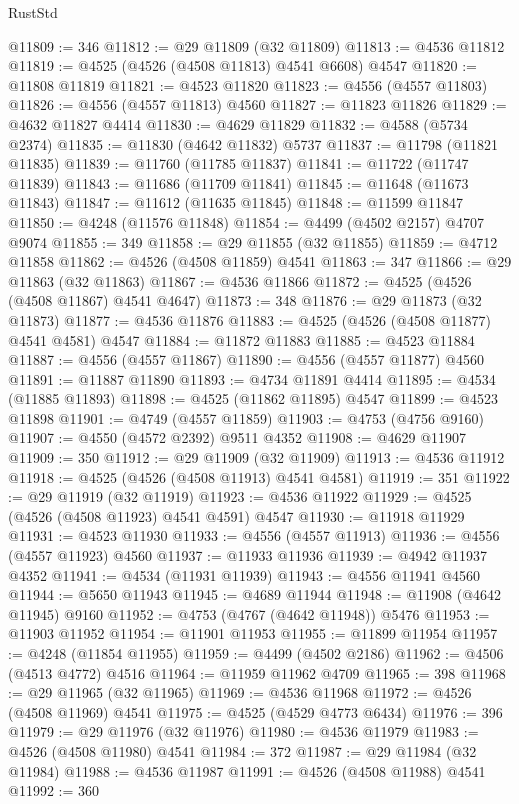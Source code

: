 \begin{lexlean}{RustStd}
\begin{coremodule}
{\begin{coremodule}
{{{{{{{{{{{{{{{{{{{{{{{{{{{{{{{{{{{{{{{{{{{{{{{{{{{{{{{@11809 := 346
@11812 := @29 @11809 (@32 @11809)
@11813 := @4536 @11812
@11819 := @4525 (@4526 (@4508 @11813) @4541 @6608) @4547
@11820 := @11808 @11819
@11821 := @4523 @11820
@11823 := @4556 (@4557 @11803)
@11826 := @4556 (@4557 @11813) @4560
@11827 := @11823 @11826
@11829 := @4632 @11827 @4414
@11830 := @4629 @11829
@11832 := @4588 (@5734 @2374)
@11835 := @11830 (@4642 @11832) @5737
@11837 := @11798 (@11821 @11835)
@11839 := @11760 (@11785 @11837)
@11841 := @11722 (@11747 @11839)
@11843 := @11686 (@11709 @11841)
@11845 := @11648 (@11673 @11843)
@11847 := @11612 (@11635 @11845)
@11848 := @11599 @11847
@11850 := @4248 (@11576 @11848)
@11854 := @4499 (@4502 @2157) @4707 @9074
@11855 := 349
@11858 := @29 @11855 (@32 @11855)
@11859 := @4712 @11858
@11862 := @4526 (@4508 @11859) @4541
@11863 := 347
@11866 := @29 @11863 (@32 @11863)
@11867 := @4536 @11866
@11872 := @4525 (@4526 (@4508 @11867) @4541 @4647)
@11873 := 348
@11876 := @29 @11873 (@32 @11873)
@11877 := @4536 @11876
@11883 := @4525 (@4526 (@4508 @11877) @4541 @4581) @4547
@11884 := @11872 @11883
@11885 := @4523 @11884
@11887 := @4556 (@4557 @11867)
@11890 := @4556 (@4557 @11877) @4560
@11891 := @11887 @11890
@11893 := @4734 @11891 @4414
@11895 := @4534 (@11885 @11893)
@11898 := @4525 (@11862 @11895) @4547
@11899 := @4523 @11898
@11901 := @4749 (@4557 @11859)
@11903 := @4753 (@4756 @9160)
@11907 := @4550 (@4572 @2392) @9511 @4352
@11908 := @4629 @11907
@11909 := 350
@11912 := @29 @11909 (@32 @11909)
@11913 := @4536 @11912
@11918 := @4525 (@4526 (@4508 @11913) @4541 @4581)
@11919 := 351
@11922 := @29 @11919 (@32 @11919)
@11923 := @4536 @11922
@11929 := @4525 (@4526 (@4508 @11923) @4541 @4591) @4547
@11930 := @11918 @11929
@11931 := @4523 @11930
@11933 := @4556 (@4557 @11913)
@11936 := @4556 (@4557 @11923) @4560
@11937 := @11933 @11936
@11939 := @4942 @11937 @4352
@11941 := @4534 (@11931 @11939)
@11943 := @4556 @11941 @4560
@11944 := @5650 @11943
@11945 := @4689 @11944
@11948 := @11908 (@4642 @11945) @9160
@11952 := @4753 (@4767 (@4642 @11948)) @5476
@11953 := @11903 @11952
@11954 := @11901 @11953
@11955 := @11899 @11954
@11957 := @4248 (@11854 @11955)
@11959 := @4499 (@4502 @2186)
@11962 := @4506 (@4513 @4772) @4516
@11964 := @11959 @11962 @4709
@11965 := 398
@11968 := @29 @11965 (@32 @11965)
@11969 := @4536 @11968
@11972 := @4526 (@4508 @11969) @4541
@11975 := @4525 (@4529 @4773 @6434)
@11976 := 396
@11979 := @29 @11976 (@32 @11976)
@11980 := @4536 @11979
@11983 := @4526 (@4508 @11980) @4541
@11984 := 372
@11987 := @29 @11984 (@32 @11984)
@11988 := @4536 @11987
@11991 := @4526 (@4508 @11988) @4541
@11992 := 360
}}}}}}}}}}}}}}}}}}}}}}}}}}}}}}}}}}}}}}}}}}}}}}}}}}}}}}}
\end{coremodule}}
\end{coremodule}
\end{lexlean}
